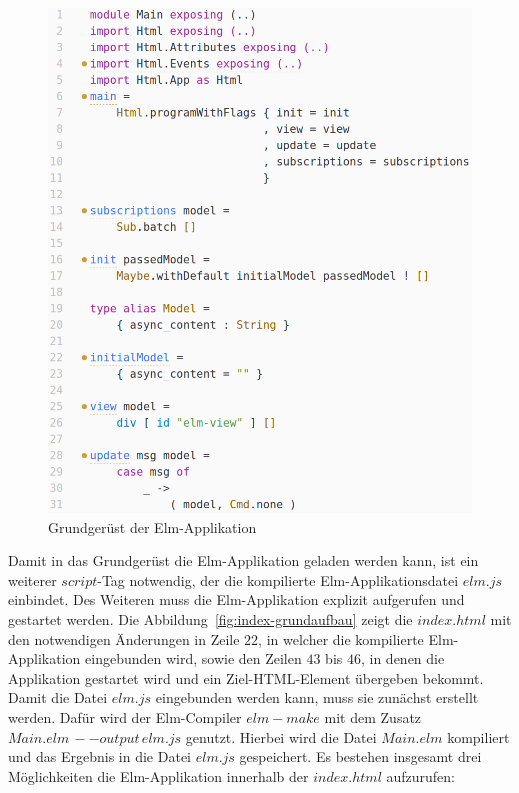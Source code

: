 \begin{figure}[p]
\centering
\includegraphics[scale=0.5]{img/elm-grundaufbau-start.png}
\caption{Grundgerüst der Elm-Applikation}\label{fig:elm-grundaufbau-start}
\end{figure}
Damit in das Grundgerüst die Elm-Applikation geladen werden kann, ist ein weiterer $script$-Tag notwendig, der die kompilierte Elm-Applikationsdatei $elm.js$ einbindet. Des Weiteren muss die Elm-Applikation explizit aufgerufen und gestartet werden. Die Abbildung~\ref{fig:index-grundaufbau} zeigt die $index.html$ mit den notwendigen Änderungen in Zeile $22$, in welcher die kompilierte Elm-Applikation eingebunden wird, sowie den Zeilen $43$ bis $46$, in denen die Applikation gestartet wird und ein Ziel-\ac{HTML}-Element übergeben bekommt. Damit die Datei $elm.js$ eingebunden werden kann, muss sie zunächst erstellt werden. Dafür wird der Elm-Compiler $elm-make$ mit dem Zusatz $Main.elm\,--output\,elm.js$ genutzt. Hierbei wird die Datei $Main.elm$ kompiliert und das Ergebnis in die Datei $elm.js$ gespeichert.
Es bestehen insgesamt drei Möglichkeiten die Elm-Applikation innerhalb der $index.html$ aufzurufen:
